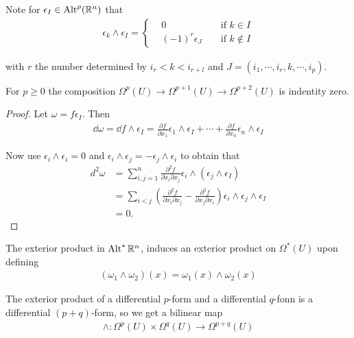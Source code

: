 Note for $\epsilon_I\in \operatorname{Alt}^p(\mathbb{R}^n)$ that
\begin{align*}
  \epsilon_k\wedge\epsilon_I 
  = \left\{\begin{aligned}
    &0 && \text{ if } k\in I \\
    &(-1)^{r}\epsilon_{J} && \text{ if } k\not\in I
  \end{aligned}\right.
\end{align*}

with $r$ the number determined by $i_r < k < i_{r+l}$ and $J=(i_1, \cdots, i_r, k, \cdots, i_p)$.


\begin{lemma}\label{lemma:3-5}
  For $p\ge 0$ the composition $\Omega^p(U)\to\Omega^{p+1}(U)\to\Omega^{p+2}(U)$ is 
  indentity zero.
\end{lemma}

\begin{proof}
  Let $\omega = f\epsilon_I$. Then 
  \begin{align*}
    \dd\omega 
    = \dd f\wedge\epsilon_I
    = \frac{\partial f }{\partial x_1}\epsilon_1\wedge\epsilon_I + \cdots + \frac{\partial f}{\partial x_n}\epsilon_n\wedge\epsilon_I
  \end{align*}

  Now use $\epsilon_i\wedge\epsilon_i=0$ and $\epsilon_i\wedge\epsilon_j=-\epsilon_j\wedge\epsilon_i$ to obtain that 
  \begin{align*}
      d^{2}\omega 
      & = \sum_{i,j=1}^{n}\frac{\partial^{2}f}{\partial x_{i}\partial x_{j}}
        \epsilon_{i}\wedge(\epsilon_{j}\wedge\epsilon_{I}) \\
      & = \sum_{i<j}\left(\frac{\partial^{2}f}{\partial x_{i}\partial x_{j}}-\frac{\partial^{2}f}{\partial x_{j}\partial x_{i}}\right)
        \epsilon_{i}\wedge\epsilon_{j}\wedge\epsilon_{I}\\
      & = 0.
  \end{align*}
\end{proof}

The exterior product in $\operatorname{Alt}^{*}\mathbb{R}^n$, induces an exterior product on $\Omega^*(U)$ upon 
defining
\begin{align*}
  (\omega_1\wedge\omega_2)(x) = \omega_1(x)\wedge\omega_2(x)
\end{align*}

The exterior product of a differential $p$-form and a differential $q$-fonn is a
differential $(p + q)$-form, so we get a bilinear map
\begin{align*}
  \wedge: \Omega^p(U)\times\Omega^q(U)\to\Omega^{p+q}(U)
\end{align*}

